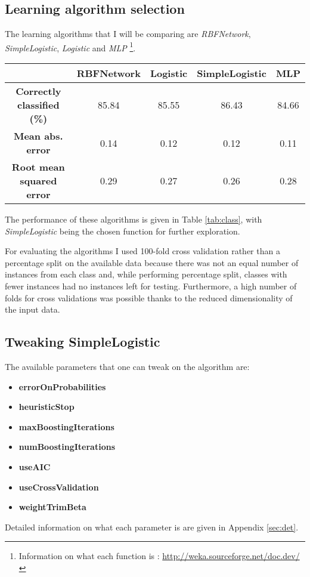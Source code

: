 \documentclass[12pt,twocolumn,a4paper]{article}
\begin{document}
\subsection{Learning algorithm selection} The learning algorithms that I will be comparing are \textit{RBFNetwork}, \textit{SimpleLogistic}, \textit{Logistic} and \textit{MLP} \footnote{Information on what each function is : \href{http://weka.sourceforge.net/doc.dev/}{http://weka.sourceforge.net/doc.dev/}}.

\begin{table*}
\centering
\begin{tabular}{c | c | c | c | c }
    & \textbf{RBFNetwork} & \textbf{Logistic} & \textbf{SimpleLogistic} & \textbf{MLP}   \\ \hline
    \textbf{Correctly classified (\%)} & 85.84      & 85.55    & 86.43          & 84.66 \\
    \textbf{Mean abs. error}           & 0.14       & 0.12     & 0.12           & 0.11  \\
    \textbf{Root mean squared error}   & 0.29       & 0.27     & 0.26           & 0.28  \\
    \end{tabular}
 \label{tab:class}
 \caption{Performance statistics of various learning algorithms.}   
\end{table*}

The performance of these algorithms is given in Table \ref{tab:class}, with \textit{SimpleLogistic} being the chosen function for further exploration.

For evaluating the algorithms I used 100-fold cross validation rather than a percentage split on the available data because there was not an equal number of instances from each class and, while performing percentage split, classes with fewer instances had no instances left for testing. Furthermore, a high number of folds for cross validations was possible thanks to the reduced dimensionality of the input data.

\subsection{Tweaking SimpleLogistic}
\label{sub:tweak}
The available parameters that one can tweak on the algorithm are:
\begin{itemize}
\item \textbf{errorOnProbabilities}
\item \textbf{heuristicStop}
\item \textbf{maxBoostingIterations}
\item \textbf{numBoostingIterations}
\item \textbf{useAIC}
\item \textbf{useCrossValidation}
\item \textbf{weightTrimBeta}
\end{itemize}
Detailed information on what each parameter is are given in Appendix \ref{sec:det}.
\end{document}
